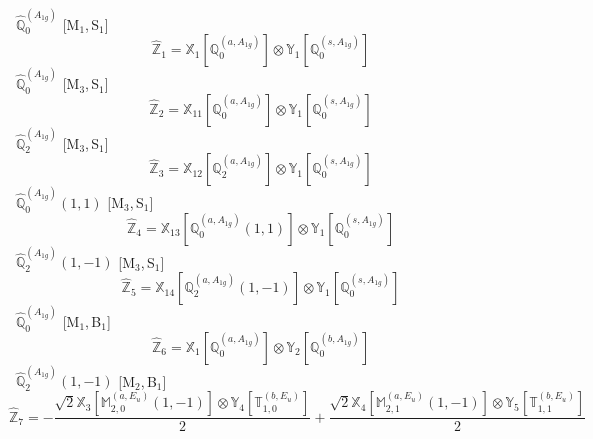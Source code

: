 \documentclass[fleqn,10pt,landscape]{article}
\begin{document}
\begin{itemize}
\vspace{4mm}
\noindent {} $\,\,\,\hat{\mathbb{Q}}_{0}^{(A_{1g})}$ [M$_{1}$,\,S$_{1}$]
\begin{dmath*}
\hat{\mathbb{Z}}_{1}=\mathbb{X}_{1}[\mathbb{Q}_{0}^{(a,A_{1g})}] \otimes\mathbb{Y}_{1}[\mathbb{Q}_{0}^{(s,A_{1g})}]
\end{dmath*}
\vspace{4mm}
\noindent {} $\,\,\,\hat{\mathbb{Q}}_{0}^{(A_{1g})}$ [M$_{3}$,\,S$_{1}$]
\begin{dmath*}
\hat{\mathbb{Z}}_{2}=\mathbb{X}_{11}[\mathbb{Q}_{0}^{(a,A_{1g})}] \otimes\mathbb{Y}_{1}[\mathbb{Q}_{0}^{(s,A_{1g})}]
\end{dmath*}
\vspace{4mm}
\noindent {} $\,\,\,\hat{\mathbb{Q}}_{2}^{(A_{1g})}$ [M$_{3}$,\,S$_{1}$]
\begin{dmath*}
\hat{\mathbb{Z}}_{3}=\mathbb{X}_{12}[\mathbb{Q}_{2}^{(a,A_{1g})}] \otimes\mathbb{Y}_{1}[\mathbb{Q}_{0}^{(s,A_{1g})}]
\end{dmath*}
\vspace{4mm}
\noindent {} $\,\,\,\hat{\mathbb{Q}}_{0}^{(A_{1g})}(1,1)$ [M$_{3}$,\,S$_{1}$]
\begin{dmath*}
\hat{\mathbb{Z}}_{4}=\mathbb{X}_{13}[\mathbb{Q}_{0}^{(a,A_{1g})}(1,1)] \otimes\mathbb{Y}_{1}[\mathbb{Q}_{0}^{(s,A_{1g})}]
\end{dmath*}
\vspace{4mm}
\noindent {} $\,\,\,\hat{\mathbb{Q}}_{2}^{(A_{1g})}(1,-1)$ [M$_{3}$,\,S$_{1}$]
\begin{dmath*}
\hat{\mathbb{Z}}_{5}=\mathbb{X}_{14}[\mathbb{Q}_{2}^{(a,A_{1g})}(1,-1)] \otimes\mathbb{Y}_{1}[\mathbb{Q}_{0}^{(s,A_{1g})}]
\end{dmath*}
\vspace{4mm}
\noindent {} $\,\,\,\hat{\mathbb{Q}}_{0}^{(A_{1g})}$ [M$_{1}$,\,B$_{1}$]
\begin{dmath*}
\hat{\mathbb{Z}}_{6}=\mathbb{X}_{1}[\mathbb{Q}_{0}^{(a,A_{1g})}] \otimes\mathbb{Y}_{2}[\mathbb{Q}_{0}^{(b,A_{1g})}]
\end{dmath*}
\vspace{4mm}
\noindent {} $\,\,\,\hat{\mathbb{Q}}_{2}^{(A_{1g})}(1,-1)$ [M$_{2}$,\,B$_{1}$]
\begin{dmath*}
\hat{\mathbb{Z}}_{7}=- \frac{\sqrt{2} \mathbb{X}_{3}[\mathbb{M}_{2,0}^{(a,E_{u})}(1,-1)] \otimes\mathbb{Y}_{4}[\mathbb{T}_{1,0}^{(b,E_{u})}]}{2} + \frac{\sqrt{2} \mathbb{X}_{4}[\mathbb{M}_{2,1}^{(a,E_{u})}(1,-1)] \otimes\mathbb{Y}_{5}[\mathbb{T}_{1,1}^{(b,E_{u})}]}{2}

\end{dmath*}
\end{itemize}
\end{document}
